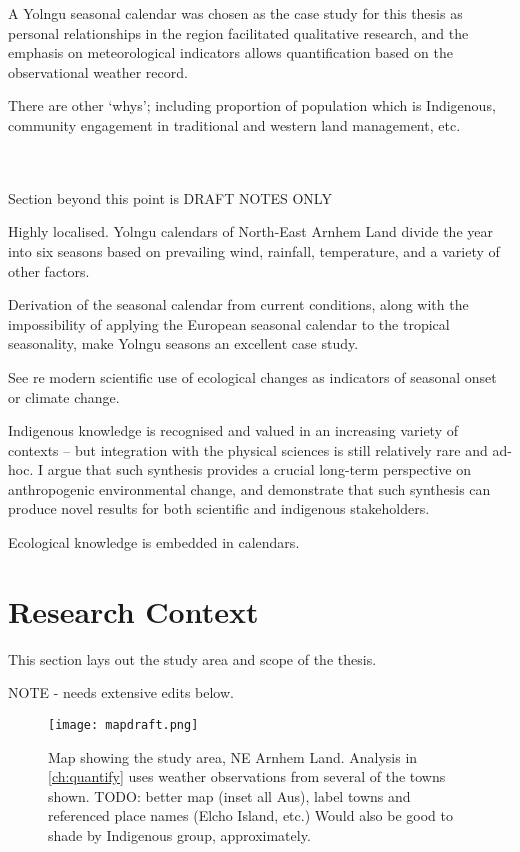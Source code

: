 A Yolngu seasonal calendar was chosen as the case study for this thesis
as personal relationships in the region facilitated qualitative research,
and the emphasis on meteorological indicators allows quantification based
on the observational weather record.


There are other `whys'; including proportion of population which is Indigenous,
community engagement in traditional and western land management, etc.


~\\
~\\
Section beyond this point is DRAFT NOTES ONLY


Highly localised.
Yolngu calendars of North-East Arnhem Land divide the year into
six seasons based on prevailing wind, rainfall, temperature,
and a variety of other factors.

Derivation of the seasonal calendar from current conditions,
along with the impossibility of applying the European seasonal calendar
to the tropical seasonality, make Yolngu seasons an excellent case study.

See \citet{menzel2006} re modern scientific use of ecological changes
as indicators of seasonal onset or climate change.



Indigenous knowledge is recognised and valued in an increasing variety
of contexts \citep[eg.][]{petheram2010,cochran2015,berkes2012} –
but integration with the physical sciences is still relatively rare and ad-hoc.
%
I argue that such synthesis provides a crucial long-term perspective on
anthropogenic environmental change, and demonstrate that such synthesis
can produce novel results for both scientific and indigenous stakeholders.

Ecological knowledge is embedded in calendars.




\section{Research Context}
\label{ch:context}
This section lays out the study area and scope of the thesis.

NOTE - needs extensive edits below.\\



\begin{figure}[h]
    \centering
    \texttt{[image: mapdraft.png]}
    \caption[Map showing the study area, NE Arnhem Land]{
        Map showing the study area, NE Arnhem Land.
        Analysis in \autoref{ch:quantify} uses weather observations from several of the towns shown.
        TODO:  better map (inset all Aus), label towns and referenced place names
        (Elcho Island, etc.)
        Would also be good to shade by Indigenous group, approximately.
        }
    \label{fig:arnhem-map}
\end{figure}

